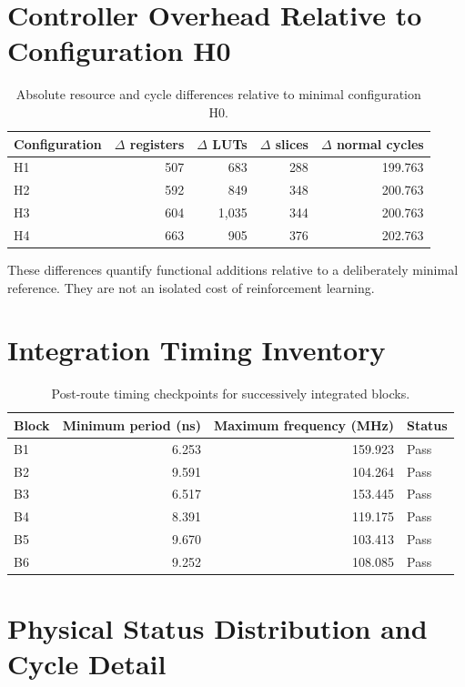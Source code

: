 \section{Controller Overhead Relative to Configuration H0}

\begin{table}[H]
\centering
\caption{Absolute resource and cycle differences relative to minimal configuration H0.}
\label{tab:overhead-h0}
\begin{tabular}{@{}lrrrr@{}}
\toprule
\textbf{Configuration} & \textbf{$\Delta$ registers} & \textbf{$\Delta$ LUTs} &
\textbf{$\Delta$ slices} & \textbf{$\Delta$ normal cycles}\\
\midrule
H1 & 507 & 683 & 288 & 199.763\\
H2 & 592 & 849 & 348 & 200.763\\
H3 & 604 & 1,035 & 344 & 200.763\\
H4 & 663 & 905 & 376 & 202.763\\
\bottomrule
\end{tabular}
\end{table}

These differences quantify functional additions relative to a deliberately minimal
reference. They are not an isolated cost of reinforcement learning.

\section{Integration Timing Inventory}

\begin{table}[H]
\centering
\caption{Post-route timing checkpoints for successively integrated blocks.}
\label{tab:integration-timing}
\begin{tabular}{@{}lrrl@{}}
\toprule
\textbf{Block} & \textbf{Minimum period (ns)} &
\textbf{Maximum frequency (MHz)} & \textbf{Status}\\
\midrule
B1 & 6.253 & 159.923 & Pass\\
B2 & 9.591 & 104.264 & Pass\\
B3 & 6.517 & 153.445 & Pass\\
B4 & 8.391 & 119.175 & Pass\\
B5 & 9.670 & 103.413 & Pass\\
B6 & 9.252 & 108.085 & Pass\\
\bottomrule
\end{tabular}
\end{table}

\section{Physical Status Distribution and Cycle Detail}

